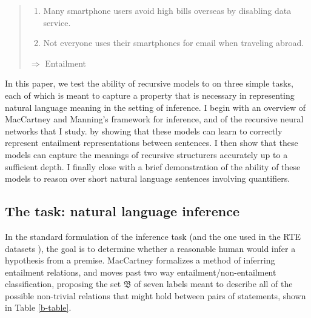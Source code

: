 \begin{quote}
\begin{enumerate}\small
\item Many smartphone users avoid high bills overseas by disabling data service.
\item Not everyone uses their smartphones for email when traveling abroad.
\end{enumerate} 
$\Rightarrow$ Entailment
\end{quote}

In this paper, we test the ability of recursive models to on three simple tasks, each of which is meant to capture a property that is necessary in representing natural language meaning in the setting of inference. I begin with an overview of MacCartney and Manning's \cite{maccartney2009extended} framework for inference, and of the recursive neural networks that I study. by showing that these models can learn to correctly represent entailment representations between sentences. I then show that these models can capture the meanings of recursive structurers accurately up to a sufficient depth. I finally close with a brief demonstration of the ability of these models to reason over short natural language sentences involving quantifiers. 


\subsection{The task: natural language inference}

In the standard formulation of the inference task (and the one used in the RTE datasets \cite{dagan2006pascal}), the goal is to determine whether a reasonable human would infer a hypothesis from a premise.
MacCartney formalizes a method of inferring entailment relations, and moves past two way entailment/non-entailment classification, proposing the set $\mathfrak{B}$ of seven labels meant to describe all of the possible non-trivial relations that might hold between pairs of statements, shown in Table \ref{b-table}. 

